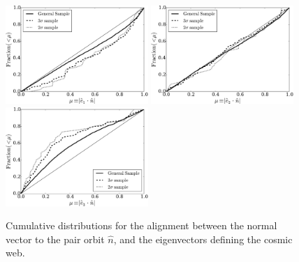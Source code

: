 \documentclass{emulateapj}
\begin{document}
\begin{figure}
\begin{center}
  \includegraphics[width=0.48\textwidth]{alignments_e1_n_all_environments.pdf} 
  \includegraphics[width=0.48\textwidth]{alignments_e2_n_all_environments.pdf} 
  \includegraphics[width=0.48\textwidth]{alignments_e3_n_all_environments.pdf} 
\end{center}
\caption{Cumulative distributions for the alignment between the normal vector to the pair orbit
$\hat{n}$, and the eigenvectors defining the cosmic web.
    \label{fig:alignment}}  
\end{figure}

\end{document}
